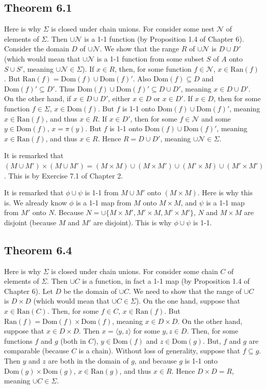 \documentclass{article}
\theoremstyle{definition}
\begin{document}
\subsection*{Theorem 6.1}
Here is why $\Sigma$ is closed under chain unions. For consider some nest $\mathcal{N}$ of elements of $\Sigma$. 
Then $\cup\mathcal{N}$ is a 1-1 function (by Proposition 1.4 of Chapter 6). 
Consider the domain $D$ of $\cup\mathcal{N}$. We show that the range $R$ of $\cup\mathcal{N}$ is $D\cup D'$ (which would mean that 
$\cup\mathcal{N}$ is a 1-1 function from some subset $S$ of $A$ onto $S\cup S'$, meaning $\cup\mathcal{N}\in\Sigma$). If 
$x\in R$, then, for some function $f\in\mathcal{N}$, $x\in\textrm{Ran}(f)$. 
But $\textrm{Ran}(f)=\textrm{Dom}(f)\cup\textrm{Dom}(f)'$. Also $\textrm{Dom}(f)\subseteq D$ and 
$\textrm{Dom}(f)'\subseteq D'$. Thus $\textrm{Dom}(f)\cup\textrm{Dom}(f)'\subseteq D\cup D'$, meaning 
$x\in D\cup D'$.
On the other hand, if $x\in D\cup D'$, either $x\in D$ or $x\in D'$. If 
$x\in D$, then for some function $f\in\Sigma$, $x\in\textrm{Dom}(f)$. But $f$ is 1-1 onto $\textrm{Dom}(f)\cup\textrm{Dom}(f)'$, meaning 
$x\in\textrm{Ran}(f)$, and thus $x\in R$. If $x\in D'$, then for some $f\in\mathcal{N}$ and some $y\in\textrm{Dom}(f)$, $x=\pi(y)$. But 
$f$ is 1-1 onto $\textrm{Dom}(f)\cup\textrm{Dom}(f)'$, meaning $x\in\textrm{Ran}(f)$, and thus $x\in R$. Hence $R=D\cup D'$, 
meaning $\cup\mathcal{N}\in\Sigma$.

It is remarked that $(M\cup M')\times (M\cup M')=(M\times M)\cup (M\times M')\cup (M'\times M)\cup (M'\times M')$. This is by 
Exercise 7.1 of Chapter 2.

It is remarked that $\phi\cup\psi$ is 1-1 from $M\cup M'$ onto $(M\times M)$. Here is why this is. We already know 
$\phi$ is a 1-1 map from $M$ onto $M\times M$, and $\psi$ is a 1-1 map from $M'$ onto $N$. Because 
$N=\cup\{M\times M',M'\times M,M'\times M'\}$, $N$ and $M\times M$ are disjoint (because $M$ and $M'$ are disjoint). This is 
why $\phi\cup\psi$ is 1-1.

\subsection*{Theorem 6.4}
Here is why $\Sigma$ is closed under chain unions. For consider some chain $C$ of elements of $\Sigma$. Then $\cup C$ is a function, 
in fact a 1-1 map (by Proposition 1.4 of Chapter 6). Let $D$ be the domain of $\cup C$. 
We need to show that the range of $\cup C$ is $D\times D$ (which would mean that 
$\cup C\in\Sigma$). On the one hand, suppose that $x\in\textrm{Ran}(C)$. Then, for some $f\in C$, $x\in\textrm{Ran}(f)$. 
But $\textrm{Ran}(f)=\textrm{Dom}(f)\times\textrm{Dom}(f)$, meaning $x\in D\times D$. On the other hand, suppose that 
$x\in D\times D$. Then $x=\langle y,z\rangle$ for some $y,z\in D$. Then, for some functions 
$f$ and $g$ (both in $C$), $y\in\textrm{Dom}(f)$ and $z\in\textrm{Dom}(g)$. But, $f$ and $g$ are comparable (because $C$ is a chain).
Without loss of generality, suppose that $f\subseteq g$. Then $y$ and $z$ are both in the domain of 
$g$, and because $g$ is 1-1 onto $\textrm{Dom}(g)\times\textrm{Dom}(g)$, $x\in\textrm{Ran}(g)$, and thus 
$x\in R$. Hence $D\times D=R$, meaning $\cup C\in\Sigma$.
\end{document}
